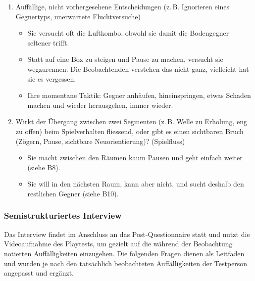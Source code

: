 \documentclass[../Main.tex]{subfiles}
\begin{document}
\begin{enumerate}[label=\textbf{B\arabic*}, leftmargin=1.5cm, itemsep=0.8em, resume]
    \item Auffällige, nicht vorhergesehene Entscheidungen (z.\,B. Ignorieren eines Gegnertyps, unerwartete Fluchtversuche)
    \begin{itemize}[nosep]
        \item Sie versucht oft die Luftkombo, obwohl sie damit die Bodengegner seltener trifft.
        \item Statt auf eine Box zu steigen und Pause zu machen, versucht sie wegzurennen. Die Beobachtenden verstehen das nicht ganz, vielleicht hat sie es vergessen.
        \item Ihre momentane Taktik: Gegner anhäufen, hineinspringen, etwas Schaden machen und wieder herausgehen, immer wieder.
    \end{itemize}

    \item Wirkt der Übergang zwischen zwei Segmenten (z.\,B. Welle zu Erholung, eng zu offen) beim Spielverhalten fliessend, oder gibt es einen sichtbaren Bruch (Zögern, Pause, sichtbare Neuorientierung)? \hfill (Spielfluss)
    \begin{itemize}[nosep]
        \item Sie macht zwischen den Räumen kaum Pausen und geht einfach weiter (siehe B8).
        \item Sie will in den nächsten Raum, kann aber nicht, und sucht deshalb den restlichen Gegner (siehe B10).
    \end{itemize}
\end{enumerate}

\subsubsection{Semistrukturiertes Interview}

Das Interview findet im Anschluss an das Post-Questionnaire statt und nutzt die Videoaufnahme des Playtests, um gezielt auf die während der Beobachtung notierten Auffälligkeiten einzugehen. Die folgenden Fragen dienen als Leitfaden und wurden je nach den tatsächlich beobachteten Auffälligkeiten der Testperson angepasst und ergänzt.
\end{document}
